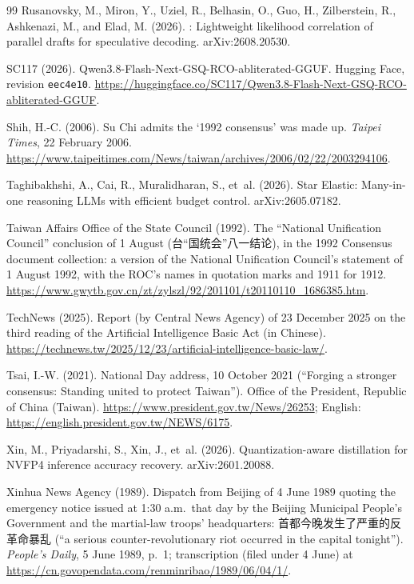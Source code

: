 \documentclass[11pt,a4paper]{article}
\newcommand{\zhs}[1]{#1}
\begin{document}
\begin{thebibliography}{99}
Rusanovsky, M., Miron, Y., Uziel, R., Belhasin, O., Guo, H., Zilberstein, R., Ashkenazi, M., and Elad, M. (2026).
: Lightweight likelihood correlation of parallel drafts for speculative decoding.
\newblock arXiv:2608.20530.

SC117 (2026).
\newblock Qwen3.8-Flash-Next-GSQ-RCO-abliterated-GGUF.
\newblock Hugging Face, revision \texttt{eec4e10}.
\newblock \url{https://huggingface.co/SC117/Qwen3.8-Flash-Next-GSQ-RCO-abliterated-GGUF}.

Shih, H.-C. (2006).
\newblock Su Chi admits the `1992 consensus' was made up. \emph{Taipei Times}, 22 February 2006.
\newblock \url{https://www.taipeitimes.com/News/taiwan/archives/2006/02/22/2003294106}.

Taghibakhshi, A., Cai, R., Muralidharan, S., et~al. (2026).
\newblock Star Elastic: Many-in-one reasoning {LLMs} with efficient budget control.
\newblock arXiv:2605.07182.

Taiwan Affairs Office of the State Council (1992).
\newblock The ``National Unification Council'' conclusion of 1 August (\zhs{台“国统会”八一结论}), in the 1992
Consensus document collection: a version of the National Unification Council's statement of 1 August 1992, with
the ROC's names in quotation marks and 1911 for 1912.
\newblock \url{https://www.gwytb.gov.cn/zt/zylszl/92/201101/t20110110_1686385.htm}.

TechNews (2025).
\newblock Report (by Central News Agency) of 23 December 2025 on the third reading of the Artificial Intelligence
Basic Act (in Chinese).
\newblock \url{https://technews.tw/2025/12/23/artificial-intelligence-basic-law/}.

Tsai, I.-W. (2021).
\newblock National Day address, 10 October 2021 (``Forging a stronger consensus: Standing united to protect
Taiwan''). Office of the President, Republic of China (Taiwan).
\newblock \url{https://www.president.gov.tw/News/26253}; English: \url{https://english.president.gov.tw/NEWS/6175}.

Xin, M., Priyadarshi, S., Xin, J., et~al. (2026).
\newblock Quantization-aware distillation for {NVFP4} inference accuracy recovery.
\newblock arXiv:2601.20088.

Xinhua News Agency (1989).
\newblock Dispatch from Beijing of 4 June 1989 quoting the emergency notice issued at 1:30 a.m.\ that day by the
Beijing Municipal People's Government and the martial-law troops' headquarters: \zhs{首都今晚发生了严重的反革命暴乱}
(``a serious counter-revolutionary riot occurred in the capital tonight'').
\newblock \emph{People's Daily}, 5 June 1989, p.~1; transcription (filed under 4 June) at
\url{https://cn.govopendata.com/renminribao/1989/06/04/1/}.

\end{thebibliography}
\end{document}
